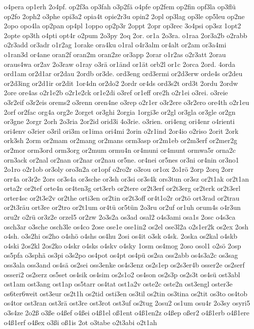 {o4pera
op1erh
2o4pf.
op2f3a
op3fah
o3p2fä
o4pfe
op2fem
op2fin
opf3la
op3flü
op2fo
2oph2
o3phe
opi3a2
opia4t
opie2r3u
opin2
2opl
op3lag
op3le
op5leu
op2ne
2opo
opo4la
op2pan
op4pl
1oppo
op2p3r
2oppt
2opr
op3rec
3o4psi
op3sz
1opt2
2opte
op3th
o4pti
opt4r
o2pum
2o3py
2oq
2or.
or1a
2o3ra.
o1raa
2or3a2b
o2rabb
o2r3add
or3adr
o1r2ag
1orake
ora4ku
o1ral
o4r3alm
or4alt
or2am
or3a4mi
o1ran3d
or4ane
oran2f
oran2m
oran2ze
or3app
2orar
o1r2as
o2r3att
2orau
oraus4wa
or2av
2o3raw
o1ray
o3rä
or1änd
or1ät
orb2l
or1c
2orca
2ord.
4orda
ord1am
or2d1ar
or2dau
2ordb
or3de.
ord3eng
ord3ermi
or2d3erw
orde4s
or2deu
or2d3ing
or2d1ir
or2dit
1or4dn
or2do2
2ordr
or4ds
ord3s2t
ord3t
2ordu
2ordw
2ore
ore4as
o2r1e2b
o2r1e2ck
or1e2di
o3ref
or1eff
ore2h
o2r1ei
o3rei.
o3reie
o3r2eif
o3r2eis
orems2
o3renn
oren4ne
o3rep
o2r1er
o3r2ere
o3r2ero
ore4th
o2r1eu
2orf
or2fac
org4a
org2e
2orget
or3ghi
2orgia
1orgi3e
or2gl
or3gla
or3gle
or2gn
or3gne
2orgr
2orh
2o3ria
2or2id
orid3i
4o3rie.
o3rien.
ori4eng
ori4enr
o4rienti
ori4env
o3rier
o3ril
ori3m
or1ima
ori4mi
2orin
o2r1ind
2or4io
o2riso
2orit
2ork
ork3sh
2orm
or2mam
or2mang
or2mans
orm3asp
or2m1eb
or2m3erf
or2mer2g
or2mor
orm3ord
orm3org
or2mum
ormu4n
or4muni
or4munt
ormwa5r
orna2c
orn3ack
or2nal
or2nan
or2nar
or2nau
or5ne.
or4nei
or5nes
or3ni
or4nin
or3no1
2o1ro
o2r1ob
or3oly
oro3n2a
or1opf
o2ro2r
o3rou
or1ox
2o1rö
2orp
2orq
2orr
orr4a
or3r2e
2ors
or3s4a
or3sche
or3sh
or3si
or3s4k
ors3tun
or3sz
or2t1ak
or2t1an
orta2r
or2tef
orte4n
or4ten3g
ort3erb
or2tere
or2t3erf
or2t3erg
or2terk
or2t3erl
orter4sc
or2t3e2v
or2the
orti3en
or2tin
or2t3off
or4t1o2r
or2tö
ort3rad
or2trau
or2t3räu
ort3re
or2tro
or2t1um
or4tü
or5tün
2o3ru
or2uf
or1uh
orum4s
o4r3un
oru2r
o2rü
or3z2e
orzel5
or2zw
2o3s2a
os3ad
osal2
o4s3ami
osa1s
2osc
o4s3ca
osch3ar
o3sche
osch3le
os4co
2ose
ose1e
ose1in2
os2el
ose3l2a
o2s1er2k
os2ex
2osh
o4sh.
o3s2hi
os2ho
o4shö
o4shs
os4hu
2osi
os4it
o3sk
o4sk.
2oska
os2kal
o4skb
o4ski
2os2kl
2os2ko
o4skr
o4sks
o4skv
o4sky
1osm
os4mog
2oso
osol1
o2sö
2osp
os5pfa
o3sphä
os3pi
o3s2po
os4pot
os4pt
os4pü
os2sa
oss2abb
os4s3a2c
os3sag
oss3ala
oss3and
os4sä
os2sei
oss3enke
os4s3enz
os2s1ep
os2s3er4b
osser2e
os2serf
osseri2
os2serz
os5set
os4sik
os4sim
os2s1o2
os4son
os2s3p
os2s3t
os4sü
ost3abl
ost1am
ost3ang
ost1ap
os5tarr
os4tat
ost1a2v
oste2c
oste2n
ost3engl
oster3e
os6ter6weit
ost3eur
os2t1h
os2tid
osti3en
os3til
os2tin
os3tina
os2tit
os3to
os4tob
os4tor
ost3ran
ost3rä
ost3re
ost3rot
ost3uf
os2tug
2osu2
os1um
osu4r
2o3sy
osyri5
o3s4ze
2o2ß
o3ße
o4ßef
o4ßei
o4ß1el
oß1ent
o4ß1en2z
o4ßep
oßer2
o4ß1erb
o4ß1ere
o4ß1erf
o4ßex
o3ßi
oß1is
2ot
o3tabe
o2t3abi
o2t1ah
}
